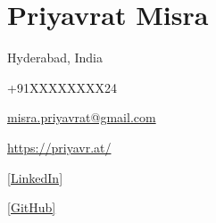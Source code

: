 \documentclass[letterpaper,10pt]{article}
\begin{document}
    \section{\huge{Priyavrat Misra}}
    \begin{enumerate*}[label={}, itemjoin={\quad}]
        \item{Hyderabad, India}
        \item{+91XXXXXXXX24}
        \item{\href{mailto:misra.priyavrat@gmail.com}{misra.priyavrat@gmail.com}}
        \item{\url{https://priyavr.at/}}
        \item{\href{https://linkedin.com/in/priyavrat-misra}{[LinkedIn]}}
        \item{\href{https://github.com/priyavrat-misra}{[GitHub]}}
    \end{enumerate*}
\end{document}
